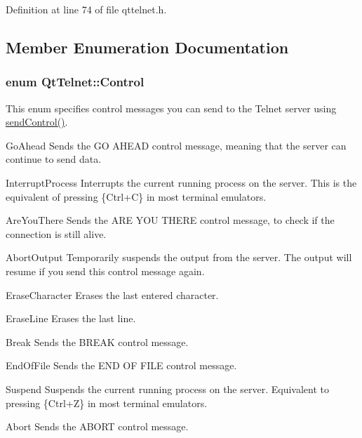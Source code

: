 Definition at line 74 of file qttelnet.h.



\subsection{Member Enumeration Documentation}
\hypertarget{classQtTelnet_a59ad635c17c3b531ac49a83bb406f89e}{
\subsubsection[{Control}]{\setlength{\rightskip}{0pt plus 5cm}enum {\bf QtTelnet::Control}}}
\label{classQtTelnet_a59ad635c17c3b531ac49a83bb406f89e}
This enum specifies control messages you can send to the Telnet server using \hyperlink{classQtTelnet_aad51391ddbdae2c34a493f2d9ce68eae}{sendControl()}.

GoAhead Sends the {\ttfamily GO} {\ttfamily AHEAD} control message, meaning that the server can continue to send data.

InterruptProcess Interrupts the current running process on the server. This is the equivalent of pressing \{Ctrl+C\} in most terminal emulators.

AreYouThere Sends the {\ttfamily ARE} {\ttfamily YOU} {\ttfamily THERE} control message, to check if the connection is still alive.

AbortOutput Temporarily suspends the output from the server. The output will resume if you send this control message again.

EraseCharacter Erases the last entered character.

EraseLine Erases the last line.

Break Sends the {\ttfamily BREAK} control message.

EndOfFile Sends the {\ttfamily END} {\ttfamily OF} {\ttfamily FILE} control message.

Suspend Suspends the current running process on the server. Equivalent to pressing \{Ctrl+Z\} in most terminal emulators.

Abort Sends the {\ttfamily ABORT} control message.


